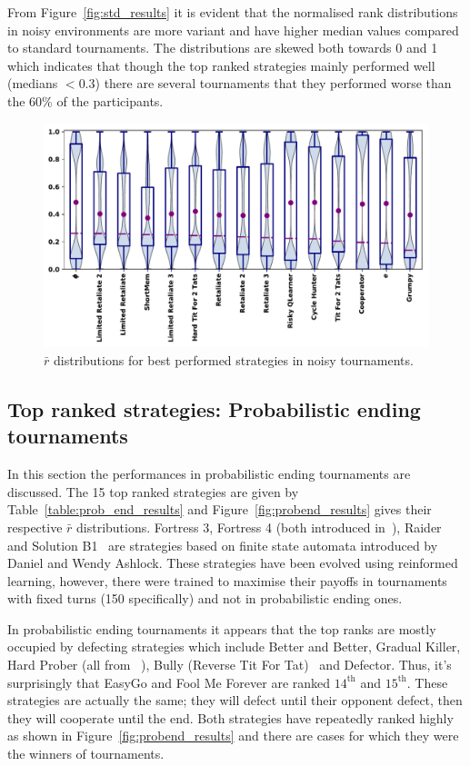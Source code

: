 \documentclass{article}
\begin{document}
From Figure~\ref{fig:std_results} it is evident that the normalised rank distributions
in noisy environments are more variant and have higher median values compared
to standard tournaments. The distributions are skewed both towards
0 and 1 which indicates that though the top ranked strategies mainly
performed well (medians $< 0.3$) there are several tournaments that they performed
worse than the 60\% of the participants.

\begin{figure}[!htbp]
    \centering
    \includegraphics[width=.7\textwidth]{../images/performance_noise.pdf}
    \caption{\(\bar{r}\) distributions for best performed strategies in noisy tournaments.}
    \label{fig:noisy_results}
\end{figure}

\subsection{Top ranked strategies: Probabilistic ending tournaments}\label{subsection:probend_tournament}

In this section the performances in probabilistic ending tournaments are
discussed. The 15 top ranked strategies are given by
Table~\ref{table:prob_end_results} and Figure~\ref{fig:probend_results} gives
their respective $\bar{r}$ distributions.
Fortress 3, Fortress 4 (both introduced in~\cite{Ashlock2006}),
Raider~\cite{Ashlock2014} and Solution B1~\cite{Ashlock2014} are strategies
based on finite state automata introduced by Daniel and Wendy Ashlock. These
strategies have been evolved using reinformed learning, however, there were
trained to maximise their payoffs in tournaments with fixed turns (150
specifically) and not in probabilistic ending ones.

In probabilistic ending tournaments it appears that the top ranks are mostly
occupied by defecting strategies which include Better and Better, Gradual
Killer, Hard Prober (all from ~\cite{prison}), Bully (Reverse Tit For
Tat)~\cite{Nachbar1992} and Defector. Thus, it's surprisingly that EasyGo and
Fool Me Forever are ranked $14^{\text{th}}$ and $15^{\text{th}}$. These
strategies are actually the same; they will defect until their opponent defect,
then they will cooperate until the end. Both strategies have repeatedly ranked highly
as shown in Figure~\ref{fig:probend_results} and there are cases for which they
were the winners of tournaments.
\end{document}
